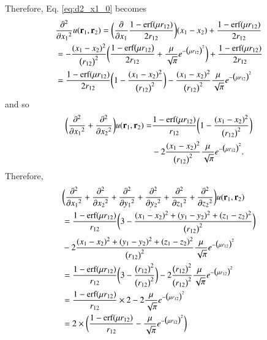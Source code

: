 \documentclass[aip,jcp,reprint,noshowkeys,superscriptaddress]{revtex4-1}
\newcommand{\deriv}[3]{\frac{\partial^{#3} #1}{\partial {#2}^{#3}}}
\newcommand{\br}[0]{{\bf {r}}}
\begin{document}
Therefore, Eq. \eqref{eq:d2_x1_0} becomes 
\begin{equation}
 \begin{aligned}
 \label{eq:d2_x1_2}
& \deriv{}{x_{1}}{2}  u(\br{}_1,\br{}_2) = \bigg( \deriv{}{x_1}{} \frac{1 - \text{erf}(\mu r_{12})}{2 r_{12}}\bigg) (x_1 - x_2 ) +  \frac{1 - \text{erf}(\mu r_{12})}{2 r_{12}}  \\
& = -\frac{(x_1 - x_2)^2}{\big( r_{12} \big)^2}\bigg(\frac{1 - \text{erf}\big( \mu r_{12} \big)}{2 r_{12}}  + \frac{\mu}{\sqrt{\pi}} e^{-\big(\mu r_{12} \big)^2} \bigg) +  \frac{1 - \text{erf}(\mu r_{12})}{2 r_{12}} \\
& = \frac{1 - \text{erf}(\mu r_{12})}{2 r_{12}} \bigg( 1 - \frac{(x_1 - x_2)^2}{\big( r_{12} \big)^2} \bigg) 
- \frac{(x_1 - x_2)^2}{\big( r_{12} \big)^2}\frac{\mu}{\sqrt{\pi}} e^{-\big(\mu r_{12} \big)^2} 
 \end{aligned}
\end{equation}
and so 
\begin{equation}
 \begin{aligned}
 \label{eq:lapl_u_final}
 \bigg( \deriv{}{x_{1}}{2} + \deriv{}{x_{2}}{2} \bigg) u(\br{}_1,\br{}_2) = & \frac{1 - \text{erf}(\mu r_{12})}{r_{12}} \bigg( 1 - \frac{(x_1 - x_2)^2}{\big( r_{12} \big)^2} \bigg) \\ 
&- 2 \frac{(x_1 - x_2)^2}{\big( r_{12} \big)^2}\frac{\mu}{\sqrt{\pi}} e^{-\big(\mu r_{12} \big)^2}.
 \end{aligned}
\end{equation}
Therefore, 
\begin{equation}
 \begin{aligned}
 \label{eq:d2_x1_2}
 &\bigg( \deriv{}{x_{1}}{2} + \deriv{}{x_{2}}{2} + \deriv{}{y_{1}}{2} + \deriv{}{y_{2}}{2} + \deriv{}{z_{1}}{2} + \deriv{}{z_{2}}{2} \bigg) u(\br{}_1,\br{}_2) \\ 
 & =\frac{1 - \text{erf}(\mu r_{12})}{r_{12}} \bigg( 3 - \frac{(x_1 - x_2)^2 + (y_1 - y_2)^2 + (z_1 - z_2)^2}{\big( r_{12} \big)^2} \bigg) \\ 
&- 2 \frac{(x_1 - x_2)^2 + (y_1 - y_2)^2 + (z_1 - z_2)^2}{\big( r_{12} \big)^2}\frac{\mu}{\sqrt{\pi}} e^{-\big(\mu r_{12} \big)^2} \\
 & =\frac{1 - \text{erf}(\mu r_{12})}{r_{12}} \bigg( 3 - \frac{\big(r_{12}\big)^2}{\big( r_{12} \big)^2} \bigg) 
- 2 \frac{\big(r_{12}\big)^2}{\big( r_{12} \big)^2}\frac{\mu}{\sqrt{\pi}} e^{-\big(\mu r_{12} \big)^2} \\
 & =\frac{1 - \text{erf}(\mu r_{12})}{r_{12}} \times 2 - 2 \frac{\mu}{\sqrt{\pi}} e^{-\big(\mu r_{12} \big)^2} \\
 & = 2 \times \bigg( \frac{1 - \text{erf}(\mu r_{12})}{r_{12}} - \frac{\mu}{\sqrt{\pi}} e^{-\big(\mu r_{12} \big)^2}  \bigg)
 \end{aligned}
\end{equation}
\end{document}
